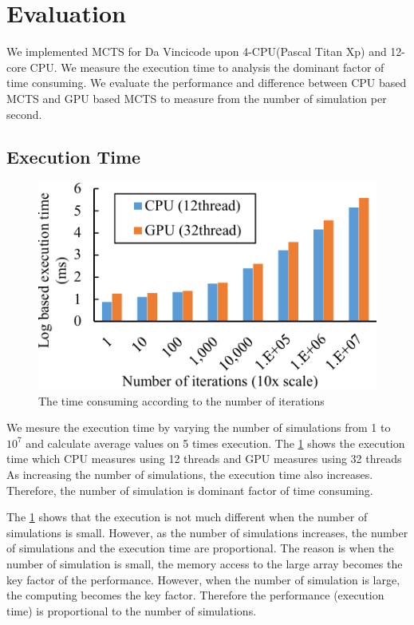 
\section{Evaluation}
We implemented MCTS for Da Vincicode upon 4-CPU(Pascal Titan Xp) and 12-core CPU.
We measure the execution time to analysis the dominant factor of time consuming.
We evaluate the performance and difference between CPU based MCTS and GPU based MCTS to measure from the number of simulation per second.

\subsection{Execution Time}
\begin{figure}
\includegraphics[width=0.95\columnwidth]{figures/time_consuming.pdf}
\caption{The time consuming according to the number of iterations}
\label{fig:time_consuming}
\end{figure}

We mesure the execution time by varying the number of simulations from 1 to $10^7$ and calculate average values on 5 times execution. 
The \cref{fig:time_consuming} shows the execution time which CPU measures using 12 threads and GPU measures using 32 threads
As increasing the number of simulations, the execution time also increases. Therefore, the number of simulation is dominant factor of time consuming. 

The \cref{fig:time_consuming} shows that the execution is not much different when the number of simulations is small. 
However, as the number of simulations increases, the number of simulations and the execution time are proportional.
The reason is when the number of simulation is small, the memory access to the large array becomes the key factor of the performance. However, when the number of simulation is large, the computing becomes the key factor. Therefore the performance (execution time) is proportional to the number of simulations.

